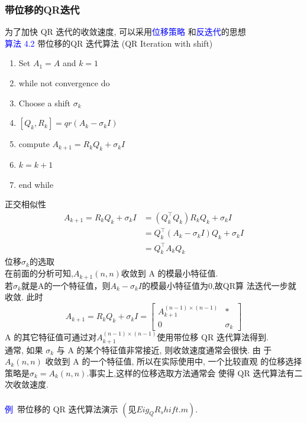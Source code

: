 \documentclass[12pt,a4paper]{article}
\begin{document}
	\subsubsection{带位移的QR迭代}
	为了加快 QR 迭代的收敛速度, 可以采用\textcolor{blue}{位移策略} 和\textcolor{blue}{反迭代}的思想\\
	\textcolor{blue}{算法 4.2} 带位移的QR 迭代算法 (QR Iteration with shift)\\
	\begin{enumerate}[1:]
		\item Set $A_{1}=A$ and $k=1$
		\item while not convergence do
		\item Choose a shift $\sigma_{k}$
		\item \qquad $[Q_{k},R_{k}]=qr(A_{k}-\sigma_{k}I)$
		\item \qquad compute $A_{k+1}=R_{k}Q_{k}+\sigma_{k}I$
		\item \qquad$k=k+1$
		\item end while
	\end{enumerate}
	正交相似性\\
	$$
	\begin{aligned} A_{k+1}=R_{k} Q_{k}+\sigma_{k} I &=\left(Q_{k}^{\top} Q_{k}\right) R_{k} Q_{k}+\sigma_{k} I \\ &=Q_{k}^{\top}\left(A_{k}-\sigma_{k} I\right) Q_{k}+\sigma_{k} I \\ &=Q_{k}^{\top} A_{k} Q_{k} \end{aligned}
	$$
	位移$\sigma_{k}$的选取\\
	在前面的分析可知,$A_{k+1}(n, n)$收敛到 A 的模最小特征值.\\
	若$\sigma_{k}$就是A的一个特征值，则$A_{k}-\sigma_{k} I$的模最小特征值为0,故QR算 法迭代一步就收敛. 此时
	$$
	A_{k+1}=R_{k} Q_{k}+\sigma_{k} I=\left[\begin{array}{cc}
	{A_{k+1}^{(n-1) \times(n-1)}} & {*} \\
	{0} & {\sigma_{k}}
	\end{array}\right]
	$$
	A 的其它特征值可通过对$A_{k+1}^{(n-1) \times(n-1)}$使用带位移 QR 迭代算法得到.\\
	通常, 如果 $\sigma_{k}$ 与 A 的某个特征值非常接近, 则收敛速度通常会很快. 由 于 $A_{k} (n, n)$ 收敛到 A 的一个特征值, 所以在实际使用中, 一个比较直观 的位移选择策略是$\sigma_{k} =A_{k}(n,n)$.事实上,这样的位移选取方法通常会 使得 QR 迭代算法有二次收敛速度.\\
	\\
	\textcolor{blue}{例}~带位移的 QR 迭代算法演示 $(见 Eig_QR_shift.m).$\\
\end{document}
